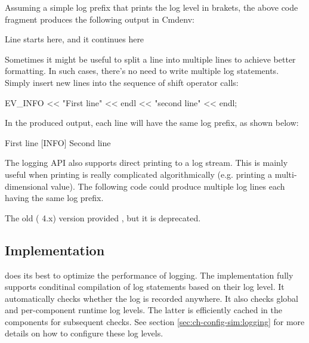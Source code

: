 Assuming a simple log prefix that prints the log level in brakets, the above
code fragment produces the following output in Cmdenv:

\begin{filelisting}
[INFO] Line starts here, and it continues here
\end{filelisting}

Sometimes it might be useful to split a line into multiple lines to achieve
better formatting. In such cases, there's no need to write multiple log
statements. Simply insert new lines into the sequence of shift operator calls:

\begin{cpp}
EV_INFO << "First line" << endl << "second line" << endl;
\end{cpp}

In the produced output, each line will have the same log prefix, as shown below:

\begin{filelisting}
[INFO] First line
[INFO] Second line
\end{filelisting}

The {\opp} logging API also supports direct printing to a log stream. This is
mainly useful when printing is really complicated algorithmically (e.g. printing
a multi-dimensional value). The following code could produce multiple log lines
each having the same log prefix.

\begin{cpp}
void Matrix::print(std::stream &output) { ... }
void Matrix::someFunction()
{
   print(EV_INFO);
\end{cpp}

\begin{note}
The old ({\opp} 4.x) version provided , but it is deprecated.
\end{note}

\subsection{Implementation}

{\opp} does its best to optimize the performance of logging. The implementation
fully supports conditinal compilation of log statements based on their log
level. It automatically checks whether the log is recorded anywhere. It also
checks global and per-component runtime log levels. The latter is efficiently
cached in the components for subsequent checks. See section
\ref{sec:ch-config-sim:logging} for more details on how to configure these log
levels.

